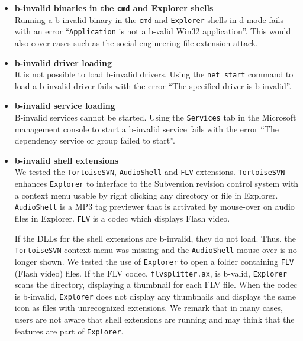 \begin{itemize}
\item{\bf b-invalid binaries in the {\tt cmd} and Explorer shells} \\
Running a b-invalid binary in the
{\tt cmd} and {\tt Explorer} shells in d-mode fails with an
error 
``{\tt Application} is not a b-valid Win32 application''.
This would also cover cases such as the social engineering file extension
attack.

\item{\bf b-invalid driver loading} \\
It is not possible to load b-invalid drivers.
Using the {\tt net start} command to load a b-invalid driver
fails with the error ``The specified driver is b-invalid''.

\item{\bf b-invalid service loading} \\
B-invalid services cannot be started.
Using the {\tt Services} tab in the Microsoft management console
to start a b-invalid service
fails with the error ``The dependency service or group failed to start''.

\item {\bf b-invalid shell extensions} \\
We tested the {\tt Tortoise\-SVN}, {\tt AudioShell} and {\tt FLV} extensions.
{\tt TortoiseSVN} enhances {\tt Explorer} to
interface to the Subversion revision control system with 
a context menu usable by right clicking any 
directory or file in Explorer. 
{\tt AudioShell} is a MP3 tag previewer that is activated by mouse-over
on audio files in Explorer.
{\tt FLV} is a codec which displays Flash video.

If the DLLs for the shell extensions are b-invalid, they do not load.
Thus, the {\tt TortoiseSVN} context menu was missing and
the {\tt AudioShell} mouse-over is no longer shown. 
We tested the use of {\tt Explorer} to open a folder containing
{\tt FLV} (Flash video) files. If the FLV codec, {\tt flvsplitter.ax},
is b-valid, {\tt Explorer} scans the directory, displaying a thumbnail
for each FLV file. When the codec is b-invalid,
{\tt Explorer} does not display any thumbnails and displays the same
icon as files with unrecognized extensions.
We remark that in many cases, users are not
aware that shell extensions are running and may think that the features
are part of {\tt Explorer}.


\end{itemize}
